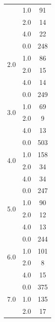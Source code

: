 \begin{longtable}{|c|c|c|c|c|}
& \multicolumn{2}{c|}{1.0} & \multicolumn{2}{c|}{91} \\
& \multicolumn{2}{c|}{2.0} & \multicolumn{2}{c|}{14} \\
& \multicolumn{2}{c|}{4.0} & \multicolumn{2}{c|}{22} \\
\hline
\multirow{4}{*}{2.0} & \multicolumn{2}{c|}{0.0} & \multicolumn{2}{c|}{248} \\
& \multicolumn{2}{c|}{1.0} & \multicolumn{2}{c|}{86} \\
& \multicolumn{2}{c|}{2.0} & \multicolumn{2}{c|}{15} \\
& \multicolumn{2}{c|}{4.0} & \multicolumn{2}{c|}{14} \\
\hline
\multirow{4}{*}{3.0} & \multicolumn{2}{c|}{0.0} & \multicolumn{2}{c|}{249} \\
& \multicolumn{2}{c|}{1.0} & \multicolumn{2}{c|}{69} \\
& \multicolumn{2}{c|}{2.0} & \multicolumn{2}{c|}{9} \\
& \multicolumn{2}{c|}{4.0} & \multicolumn{2}{c|}{13} \\
\hline
\multirow{4}{*}{4.0} & \multicolumn{2}{c|}{0.0} & \multicolumn{2}{c|}{503} \\
& \multicolumn{2}{c|}{1.0} & \multicolumn{2}{c|}{158} \\
& \multicolumn{2}{c|}{2.0} & \multicolumn{2}{c|}{34} \\
& \multicolumn{2}{c|}{4.0} & \multicolumn{2}{c|}{34} \\
\hline
\multirow{4}{*}{5.0} & \multicolumn{2}{c|}{0.0} & \multicolumn{2}{c|}{247} \\
& \multicolumn{2}{c|}{1.0} & \multicolumn{2}{c|}{90} \\
& \multicolumn{2}{c|}{2.0} & \multicolumn{2}{c|}{12} \\
& \multicolumn{2}{c|}{4.0} & \multicolumn{2}{c|}{13} \\
\hline
\multirow{4}{*}{6.0} & \multicolumn{2}{c|}{0.0} & \multicolumn{2}{c|}{244} \\
& \multicolumn{2}{c|}{1.0} & \multicolumn{2}{c|}{101} \\
& \multicolumn{2}{c|}{2.0} & \multicolumn{2}{c|}{8} \\
& \multicolumn{2}{c|}{4.0} & \multicolumn{2}{c|}{15} \\
\hline
\multirow{4}{*}{7.0} & \multicolumn{2}{c|}{0.0} & \multicolumn{2}{c|}{375} \\
& \multicolumn{2}{c|}{1.0} & \multicolumn{2}{c|}{135} \\
& \multicolumn{2}{c|}{2.0} & \multicolumn{2}{c|}{17} \\

\end{longtable}
